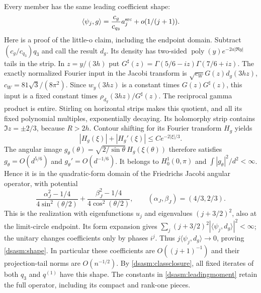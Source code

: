 \documentclass[11pt,letterpaper]{article}
\theoremstyle{remark}\newtheorem{remark}[theorem]{Remark}
\begin{document}
Every member has the same leading coefficient shape:
\begin{equation}\label{dsasm:shape}
 \langle\psi_j,g\rangle
   =\frac{c_g}{c_{q_3}}a_j^{\rm src}+o(1/(j+1)).
\end{equation}
Here is a proof of the little-o claim, including the endpoint domain.
Subtract $(c_g/c_{q_3})q_3$ and call the result $d_g$. Its density
has two-sided $\operatorname{poly}(y)e^{-2a|\Re y|}$ tails in the
strip. In $z=y/(3h)$ put
$G^\sharp(z)=\Gamma(5/6-iz)\Gamma(7/6+iz)$.
The exactly normalized Fourier input in the Jacobi transform is
$\sqrt{c_W}G(z)d_g(3hz)$, $c_W=81\sqrt3/(8\pi^2)$.
Since $w_y(3hz)$ is a constant times $G(z)G^\sharp(z)$, this input
is a fixed constant times $\rho_{d_g}(3hz)/G^\sharp(z)$.
The reciprocal gamma product is entire. Stirling on horizontal strips
makes this quotient, and all its fixed polynomial multiples, exponentially
decaying. Its holomorphy strip contains $\Im z=\pm2/3$, because
$R>2h$. Contour shifting for its Fourier transform $H_g$ yields
\[
 |H_g(\xi)|+|H_g'(\xi)|\le Ce^{-2|\xi|/3}.
\]
The angular image
$g_\theta(\theta)=\sqrt{2/\sin\theta}\,H_g(\xi(\theta))$
therefore satisfies
$g_\theta=O(d^{5/6})$ and $g_\theta'=O(d^{-1/6})$.
It belongs to $H_0^1(0,\pi)$ and
$\int |g_\theta|^2/d^2<\infty$. Hence it is in the quadratic-form
domain of the Friedrichs Jacobi angular operator, with potential
\[
 \frac{\alpha_J^2-1/4}{4\sin^2(\theta/2)}
 +\frac{\beta_J^2-1/4}{4\cos^2(\theta/2)},
 \qquad (\alpha_J,\beta_J)=(4/3,2/3).
\]
This is the realization with eigenfunctions $u_j$ and eigenvalues
$(j+3/2)^2$, also at the limit-circle endpoint.
Its form expansion gives
$\sum_j(j+3/2)^2|\langle\psi_j,d_g\rangle|^2<\infty$;
the unitary changes coefficients only by phases $i^j$.
Thus $j\langle\psi_j,d_g\rangle\to0$, proving \eqref{dsasm:shape}.
In particular these coefficients are $O((j+1)^{-1})$ and their
projection-tail norms are $O(n^{-1/2})$.
By \eqref{dsasm:classclosure}, all fixed iterates of both $q_3$ and
$q^{(1)}$ have this shape. The constants in \eqref{dsasm:leadingmoment}
retain the full operator, including its compact and rank-one pieces.
\end{document}
